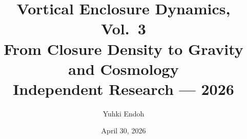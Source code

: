 \documentclass[12pt, a4paper]{article}
\title{
  \large Vortical Enclosure Dynamics, Vol.\ 3\\[0.4em]
  \LARGE \textbf{From Closure Density to Gravity and Cosmology}\\[0.6em]
  \normalsize Independent Research --- 2026
}
\author{Yuhki Endoh}
\date{April 30, 2026}
\begin{document}
\maketitle
\thispagestyle{empty}

\begin{abstract}

\end{abstract}

\newpage
\tableofcontents
\newpage















\appendix

\end{document}
